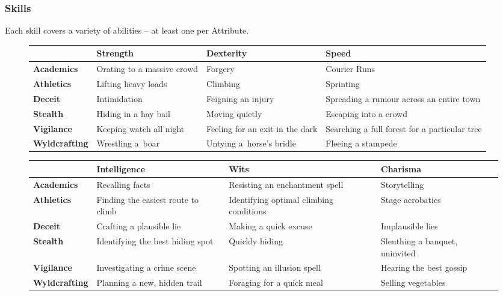 \subsubsection*{Skills}

Each skill covers a variety of abilities -- at least one per Attribute.

\begin{figure*}[t!]
\begin{tabularx}{\linewidth}{X|LLL}
  \hline
  & \textbf{Strength} & \textbf{Dexterity} & \textbf{Speed} \\\hline
  \textbf{Academics} & Orating to a massive crowd & Forgery & Courier Runs \\
  \textbf{Athletics} & Lifting heavy loads & Climbing & Sprinting \\
  \textbf{Deceit} & Intimidation & Feigning an injury & Spreading a rumour across an entire town \\
  \textbf{Stealth} & Hiding in a hay bail & Moving quietly & Escaping into a crowd \\
  \textbf{Vigilance} & Keeping watch all night & Feeling for an exit in the dark & Searching a full forest for a particular tree \\
  \textbf{Wyldcrafting} & Wrestling a~boar & Untying a~horse's bridle & Fleeing a stampede \\
  \hline
\end{tabularx}
\end{figure*}

\begin{figure*}[t!]
\begin{tabularx}{\linewidth}{X|LLL}
  \hline
  & \textbf{Intelligence} & \textbf{Wits} & \textbf{Charisma} \\\hline
  \textbf{Academics} & Recalling facts & Resisting an enchantment spell & Storytelling \\
  \textbf{Athletics} & Finding the easiest route to climb & Identifying optimal climbing conditions & Stage acrobatics \\
  \textbf{Deceit} & Crafting a plausible lie & Making a quick excuse & Implausible lies \\
  \textbf{Stealth} & Identifying the best hiding spot & Quickly hiding & Sleuthing a banquet, uninvited \\
  \textbf{Vigilance} & Investigating a crime scene & Spotting an illusion spell & Hearing the best gossip \\
  \textbf{Wyldcrafting} & Planning a new, hidden trail & Foraging for a quick meal & Selling vegetables \\
  \hline
\end{tabularx}

\end{figure*}
